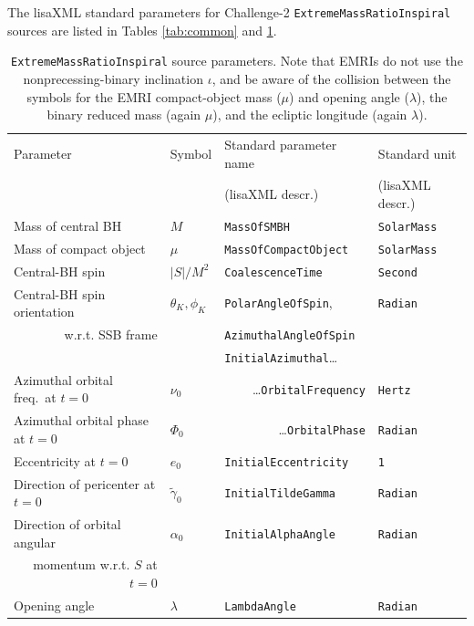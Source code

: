 \documentclass[12pt]{iopart}
\begin{document}
The lisaXML standard parameters for Challenge-2 \texttt{ExtremeMassRatioInspiral} sources are listed in Tables \ref{tab:common} and \ref{tab:emri}.
%
\begin{table}
\begin{tabular}{llll}
\hline
{Parameter} &
{Symbol} &
{Standard parameter name} &
{Standard unit} \\
& & (lisaXML descr.) & (lisaXML descr.) \\
\hline
Mass of central BH     & $M$      & \texttt{MassOfSMBH}           & \texttt{SolarMass} \\
Mass of compact object & $\mu$  & \texttt{MassOfCompactObject}  & \texttt{SolarMass} \\
Central-BH spin        & $|S|/M^2$  & \texttt{CoalescenceTime}      & \texttt{Second} \\
Central-BH spin orientation & $\theta_K, \phi_K$ & \texttt{PolarAngleOfSpin}, & \texttt{Radian} \\
 \multicolumn{1}{r}{w.r.t. SSB frame}  &                         & \texttt{AzimuthalAngleOfSpin} & \\ \hline
& & \texttt{InitialAzimuthal}\ldots & \\                   
Azimuthal orbital freq.\ at $t = 0$ & $\nu_0$ & \multicolumn{1}{r}{\ldots\texttt{OrbitalFrequency}} & \texttt{Hertz} \\
Azimuthal orbital phase at $t = 0$ & $\Phi_0$ & \multicolumn{1}{r}{\ldots\texttt{OrbitalPhase}} & \texttt{Radian} \\ \hline
Eccentricity at $t = 0$ & $e_0$ & \texttt{InitialEccentricity} & \texttt{1} \\
Direction of pericenter at $t = 0$ & $\tilde{\gamma}_0$ & \texttt{InitialTildeGamma} & \texttt{Radian} \\
Direction of orbital angular & $\alpha_0$ & \texttt{InitialAlphaAngle} & \texttt{Radian} \\
\multicolumn{1}{r}{momentum w.r.t. $S$ at $t = 0$} & & & \\
Opening angle & $\lambda$ & \texttt{LambdaAngle} & \texttt{Radian} \\ 
\hline
\end{tabular}
\caption{\texttt{ExtremeMassRatioInspiral} source parameters. Note that EMRIs do not use the nonprecessing-binary inclination $\iota$, and be aware of the collision between the symbols for the EMRI compact-object mass ($\mu$) and opening angle ($\lambda$), the binary reduced mass (again $\mu$), and the ecliptic longitude (again $\lambda$).\label{tab:emri}}
\end{table}
\end{document}
